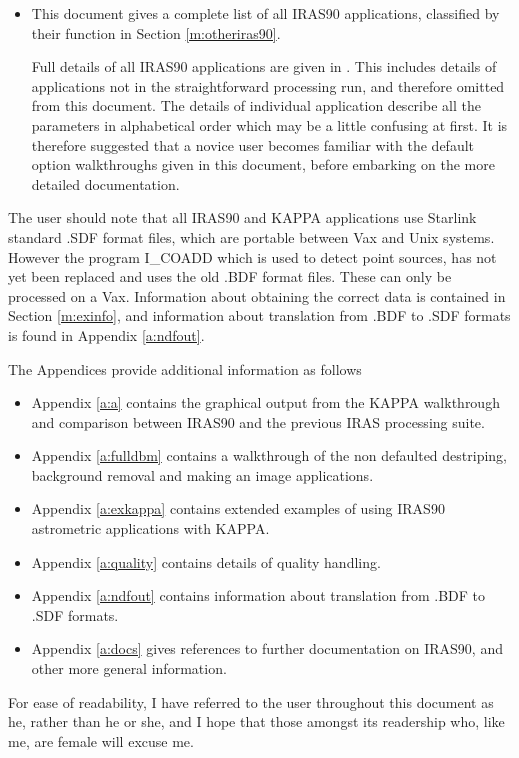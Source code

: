 \documentclass[twoside,11pt]{starlink}
\begin{document}
\begin{itemize}
\item This document gives a complete list of all IRAS90 applications, classified
by their function in Section \ref{m:otheriras90}.

Full details of all IRAS90 applications are given in
. This includes
details of applications not in the straightforward processing run, and
therefore omitted from this document. The details of individual application
describe all the parameters in alphabetical order which may be a little
confusing at first. It is therefore suggested that a novice user becomes
familiar with the default option walkthroughs given in this document, before
embarking on the more detailed documentation.
\end{itemize}

The user should note that all IRAS90 and KAPPA applications use Starlink
standard .SDF format files, which are portable between Vax and Unix systems.
However the program I\_COADD which is used to detect point sources, has not
yet been replaced and uses the old .BDF format files. These can only be
processed on a Vax. Information about obtaining the correct data is contained
in Section \ref{m:exinfo}, and information about translation from .BDF to .SDF
formats is found in Appendix \ref{a:ndfout}.

The Appendices provide additional information as follows
\begin{itemize}
\item Appendix \ref{a:a} contains the graphical output from the KAPPA
walkthrough and comparison between IRAS90 and the previous IRAS processing
suite.
\item Appendix \ref{a:fulldbm} contains a walkthrough of the non defaulted
destriping, background removal and making an image applications.
\item Appendix \ref{a:exkappa} contains extended examples of using IRAS90
astrometric applications with KAPPA.
\item Appendix \ref{a:quality} contains details of quality handling.
\item Appendix \ref{a:ndfout} contains information about translation from
.BDF to .SDF formats.
\item Appendix \ref{a:docs} gives references to further documentation on IRAS90,
and other more general information.
\end{itemize}

For ease of readability, I have referred to the user throughout this document
as he, rather than he or she, and I hope that those amongst its readership
who, like me, are female will excuse me.
\end{document}
